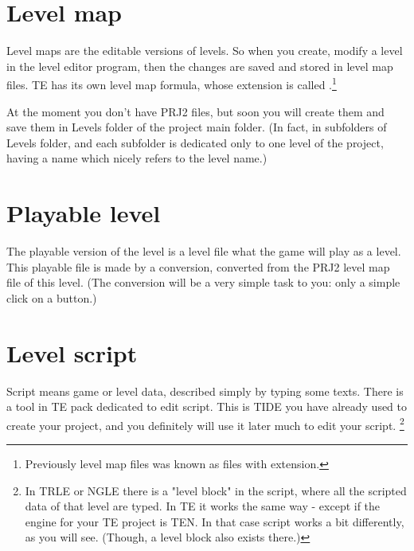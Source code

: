 \section{Level map}
Level maps are the editable versions of levels. So when you create, modify a level in the level editor program, then the changes are saved and stored in level map files.
 TE has its own level map formula, whose extension is called .\footnote{Previously level map files was known as files with  extension.}
 \par At the moment you don't have PRJ2 files, but soon you will create them and save them in Levels folder of the project main folder. (In fact, in subfolders of Levels folder, and each subfolder is dedicated only to one level of the project, having a name which nicely refers to the level name.)
 \section{Playable level}
 The playable version of the level is a level file what the game will play as a level. This playable file is made by a conversion, converted from the PRJ2 level map file of this level. (The conversion will be a very simple task to you: only a simple click on a button.)
 \section{Level script}
Script means game or level data, described simply by typing some texts.
There is a tool in TE pack dedicated to edit script. This is TIDE you have already used to create your project, and you definitely will use it later much to edit your script. \footnote{In TRLE or NGLE there is a "level block" in the script, where all the scripted data of that level are typed. In TE it works the same way - except if the engine for your TE project is TEN. In that case script works a bit differently, as you will see. (Though, a level block also exists there.)}
